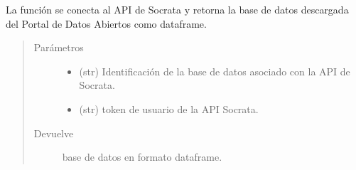 \documentclass[letterpaper,10pt,openany,spanish]{sphinxmanual}
\begin{document}
\begin{fulllineitems}
\label{\detokenize{metadatos:metadatos.sodapy_data}}
La función se conecta al API de Socrata y retorna la base de datos descargada del Portal de Datos Abiertos
como dataframe.
\begin{quote}\begin{description}
\item[{Parámetros}] \leavevmode\begin{itemize}
\item {} 
 \textendash{} (str) Identificación de la base de datos asociado con la API de Socrata.

\item {} 
 \textendash{} (str)  \sphinxhyphen{} token de usuario de la API Socrata.

\end{itemize}

\item[{Devuelve}] \leavevmode
base de datos en formato dataframe.

\end{description}\end{quote}

\end{fulllineitems}

\end{document}

